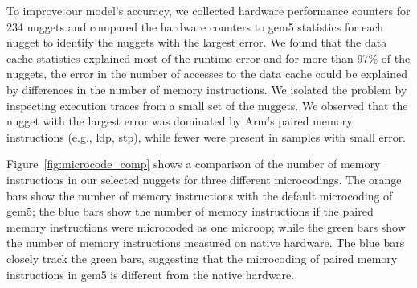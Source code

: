 To improve our model's accuracy, we collected hardware performance counters for 234 nuggets and compared the hardware counters to gem5 statistics for each nugget to identify the nuggets with the largest error.
We found that the data cache statistics explained most of the runtime error and for more than 97\% of the nuggets, the error in the number of accesses to the data cache could be explained by differences in the number of memory instructions.
We isolated the problem by inspecting execution traces from a small set of the nuggets. %
We observed that the nugget with the largest error was dominated by Arm's paired memory instructions (e.g., ldp, stp), while fewer were present in samples with small error.

Figure~\ref{fig:microcode_comp} shows a comparison of the number of memory instructions in our selected nuggets for three different microcodings.
The orange bars show the number of memory instructions with the default microcoding of gem5;
the blue bars show the number of memory instructions if the paired memory instructions were microcoded as one microop;
while the green bars show the number of memory instructions measured on native hardware.
The blue bars closely track the green bars, suggesting that the microcoding of paired memory instructions in gem5 is different from the native hardware.


